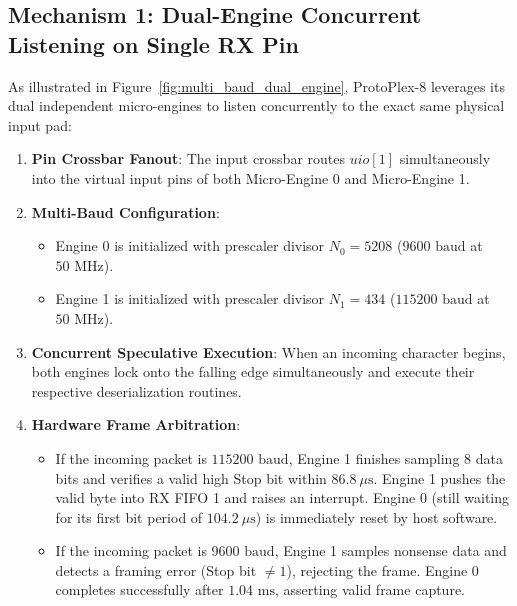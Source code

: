 \documentclass[11pt,a4paper]{article}
\begin{document}
\subsection{Mechanism 1: Dual-Engine Concurrent Listening on Single RX Pin}
As illustrated in Figure~\ref{fig:multi_baud_dual_engine}, ProtoPlex-8 leverages its dual independent micro-engines to listen concurrently to the exact same physical input pad:
\begin{enumerate}
    \item \textbf{Pin Crossbar Fanout}: The input crossbar routes $uio[1]$ simultaneously into the virtual input pins of both Micro-Engine 0 and Micro-Engine 1.
    \item \textbf{Multi-Baud Configuration}:
    \begin{itemize}
        \item Engine 0 is initialized with prescaler divisor $N_0 = 5208$ ($9600\text{ baud}$ at $50\text{ MHz}$).
        \item Engine 1 is initialized with prescaler divisor $N_1 = 434$ ($115200\text{ baud}$ at $50\text{ MHz}$).
    \end{itemize}
    \item \textbf{Concurrent Speculative Execution}: When an incoming character begins, both engines lock onto the falling edge simultaneously and execute their respective deserialization routines.
    \item \textbf{Hardware Frame Arbitration}:
    \begin{itemize}
        \item If the incoming packet is $115200\text{ baud}$, Engine 1 finishes sampling 8 data bits and verifies a valid high Stop bit within $86.8\ \mu\text{s}$. Engine 1 pushes the valid byte into RX FIFO 1 and raises an interrupt. Engine 0 (still waiting for its first bit period of $104.2\ \mu\text{s}$) is immediately reset by host software.
        \item If the incoming packet is $9600\text{ baud}$, Engine 1 samples nonsense data and detects a framing error (Stop bit $\neq 1$), rejecting the frame. Engine 0 completes successfully after $1.04\text{ ms}$, asserting valid frame capture.
    \end{itemize}
\end{enumerate}
\end{document}
